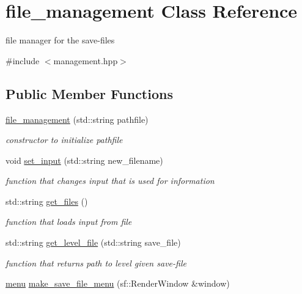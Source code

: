 \hypertarget{classfile__management}{}\section{file\+\_\+management Class Reference}
\label{classfile__management}


file manager for the save-\/files  




{\ttfamily \#include $<$management.\+hpp$>$}

\subsection*{Public Member Functions}
\begin{DoxyCompactItemize}
\item 
\hyperlink{classfile__management_ae3d7ca2804b44e05efc2ddc79c9d514d}{file\+\_\+management} (std\+::string pathfile)
\begin{DoxyCompactList}\small\item\em constructor to initialize pathfile \end{DoxyCompactList}\item 
void \hyperlink{classfile__management_a090d9aba4dd5a795428ccbfe8d4037e6}{set\+\_\+input} (std\+::string new\+\_\+filename)
\begin{DoxyCompactList}\small\item\em function that changes input that is used for information \end{DoxyCompactList}\item 
std\+::string \hyperlink{classfile__management_a6c3f90ce958156adea878510097d64ef}{get\+\_\+files} ()
\begin{DoxyCompactList}\small\item\em function that loads input from file \end{DoxyCompactList}\item 
std\+::string \hyperlink{classfile__management_a58233800263bf74ae074a9a46f4a7bd0}{get\+\_\+level\+\_\+file} (std\+::string save\+\_\+file)
\begin{DoxyCompactList}\small\item\em function that returns path to level given save-\/file \end{DoxyCompactList}\item 
\hyperlink{classmenu}{menu} \hyperlink{classfile__management_a97eda13bca5dbe703663bf81f83a77a0}{make\+\_\+save\+\_\+file\+\_\+menu} (sf\+::\+Render\+Window \&window)

\end{DoxyCompactItemize}
